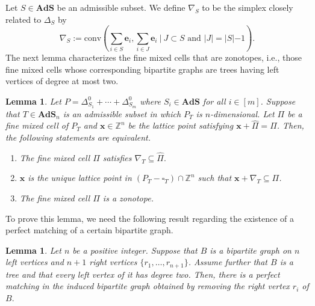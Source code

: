 \documentclass[12pt,reqno]{article}%
\newtheorem{lem}[thm]{Lemma}
\theoremstyle{definition}
\numberwithin{equation}{section}
\newcommand{\bbe}{\mathbf{e}}
\newcommand{\bbx}{\mathbf{x}}
\newcommand{\conv}{\mathrm{conv}}
\newcommand{\Z}{\mathbb Z}
\newcommand{\ads}{\mathbf{AdS}}
\begin{document}
Let $S \in \ads$ be an admissible subset. We define $\nabla_S$ to be the simplex closely related to $\Delta_S$ by $$\nabla_S:=\conv\left(\sum_{i \in S}\bbe_i,\sum_{i \in J}\bbe_i\ |\ J \subset S \text{ and } |J| = |S|-1\right).$$ 
The next lemma characterizes the fine mixed cells that are zonotopes, i.e., those fine mixed cells whose corresponding bipartite graphs are trees having left vertices of degree at most two. 

\begin{lem}\label{lem: zonotope-equivalence} Let $P = \Delta^0_{S_1} + \cdots + \Delta^0_{S_m}$ where $S_i \in \ads$ for all $i \in [m]$. Suppose that $T \in \ads_n$ is an admissible subset in which $P_T$ is $n$-dimensional. Let $\Pi$ be a fine mixed cell of $P_T$ and $\bbx \in \Z^n$ be the lattice point satisfying $\bbx+ \hat{\Pi} = \Pi$. Then, the following statements are equivalent.
\begin{enumerate}
    \item\label{itm: contains-nabla} The fine mixed cell $\Pi$ satisfies $\nabla_T \subseteq\hat{\Pi}.$
    \item \label{itm: contains-nabla-translation} $\bbx$ is the unique lattice point in $(P_T-\square_T)\cap\Z^n$ such that $\bbx + \nabla_T\subseteq \Pi$.
    \item \label{itm: zonotope} The fine mixed cell $\Pi$ is a zonotope.
    
\end{enumerate}
\end{lem}

To prove this lemma, we need the following result regarding the existence of a perfect matching of a certain bipartite graph.

\begin{lem}\label{lem: perfect-matching}
    Let $n$ be a positive integer. Suppose that $B$ is a bipartite graph on $n$ left vertices and $n+1$ right vertices $\{r_1, \dots, r_{n+1}\}$. Assume further that $B$ is a tree and that every left vertex of it has degree two. Then, there is a perfect matching in the induced bipartite graph obtained by removing the right vertex $r_i$ of $B.$
\end{lem}
\end{document}
